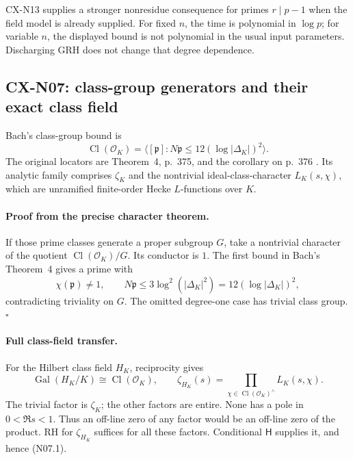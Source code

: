 \documentclass[11pt,a4paper]{article}
\begin{document}
CX-N13 supplies a stronger nonresidue consequence for primes \(r\mid p-1\)
when the field model is already supplied.
For fixed \(n\), the time is polynomial in \(\log p\); for variable
\(n\), the displayed bound is not polynomial in the usual input
parameters. Discharging GRH does not change that degree dependence.

\subsection{CX-N07: class-group generators and their exact class field}
\label{cx-n07}

Bach's class-group bound is
\[
        \operatorname{Cl}(\mathcal O_K)=
        \langle[\mathfrak p]:N\mathfrak p\leq
                             12(\log|\Delta_K|)^2\rangle .     \tag{N07.1}
\]
The original locators are Theorem~4, p.~375, and the corollary on p.~376
\cite{CXNBach90}. Its analytic family comprises \(\zeta_K\) and the
nontrivial ideal-class-character \(L_K(s,\chi)\), which are unramified
finite-order Hecke \(L\)-functions over \(K\).

\paragraph{Proof from the precise character theorem.}
If those prime classes generate a proper subgroup \(G\), take a
nontrivial character of the quotient
\(\operatorname{Cl}(\mathcal O_K)/G\). Its conductor is \(1\).
The first bound in Bach's Theorem~4 gives a prime with
\[
 \chi(\mathfrak p)\ne1,\qquad
 N\mathfrak p\leq3\log^2(|\Delta_K|^2)=12(\log|\Delta_K|)^2,
\]
contradicting triviality on \(G\). The omitted degree-one case has
trivial class group. \(\square\)

\paragraph{Full class-field transfer.}
For the Hilbert class field \(H_K\), reciprocity gives
\[
 \operatorname{Gal}(H_K/K)\cong\operatorname{Cl}(\mathcal O_K),
 \qquad
 \zeta_{H_K}(s)=
  \prod_{\chi\in\operatorname{Cl}(\mathcal O_K)^\wedge}L_K(s,\chi).
                                                                    \tag{N07.2}
\]
The trivial factor is \(\zeta_K\); the other factors are entire.
None has a pole in \(0<\Re s<1\). Thus an off-line zero of any factor
would be an off-line zero of the product. RH for \(\zeta_{H_K}\)
suffices for all these factors. Conditional \(\mathsf H\) supplies it,
and hence (N07.1).
\end{document}
